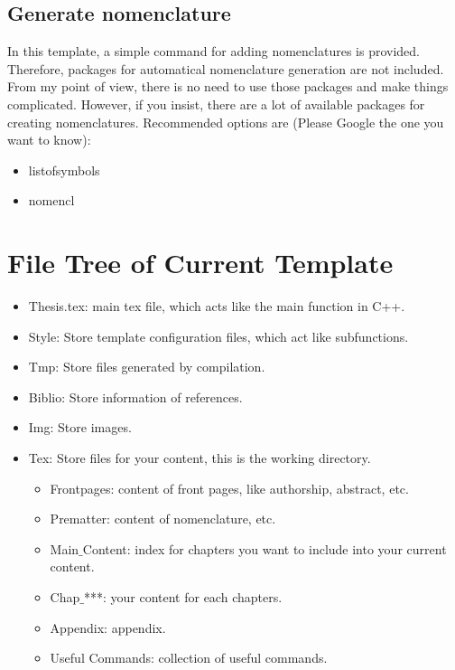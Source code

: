 \subsection{Generate nomenclature} %
In this template, a simple command for adding nomenclatures is provided. Therefore, packages for automatical nomenclature generation are not included. From my point of view, there is no need to use those packages and make things complicated. However, if you insist, there are a lot of available packages for creating nomenclatures. Recommended options are (Please Google the one you want to know):
\begin{itemize}
    \item listofsymbols
    \item nomencl
\end{itemize}

\section{File Tree of Current Template} %
\begin{itemize}
    \item Thesis.tex: main tex file, which acts like the main function in C++.
    \item Style: Store template configuration files, which act like subfunctions.
    \item Tmp: Store files generated by compilation.
    \item Biblio: Store information of references.
    \item Img: Store images.
    \item Tex: Store files for your content, this is the working directory.
        \begin{itemize}
            \item Frontpages: content of front pages, like authorship, abstract, etc.
            \item Prematter: content of nomenclature, etc.
            \item Main$\_$Content: index for chapters you want to include into your current content.
            \item Chap$\_$***: your content for each chapters.
            \item Appendix: appendix.
            \item Useful Commands: collection of useful commands.
        \end{itemize}
\end{itemize}

